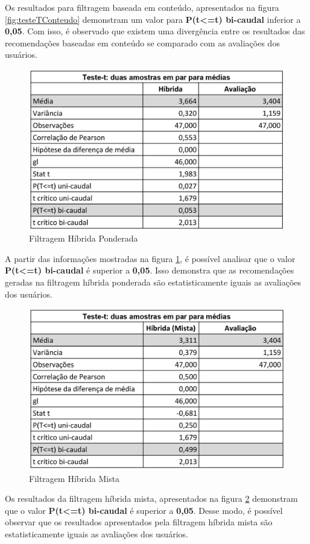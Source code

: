 Os resultados para filtragem baseada em conteúdo, apresentados na figura \ref{fig:testeTConteudo} demonstram um valor para \textbf{P(t<=t) bi-caudal} inferior a \textbf{0,05}. Com isso, é observado que existem uma divergência entre os resultados das recomendações baseadas em conteúdo se comparado com as avaliações dos usuários.

\begin{figure}[H]
	\centering
	\includegraphics[width=.7\linewidth]{imagens/testeTPonderada.jpg}
	\caption[Teste T: Filtragem Híbrida Ponderada]{Filtragem Híbrida Ponderada}
    \label{fig:testeTPonderado}
\end{figure}

A partir das informações mostradas na figura \ref{fig:testeTPonderado}, é possível analisar que o valor \textbf{P(t<=t) bi-caudal} é superior a \textbf{0,05}. Isso demonstra que as recomendações geradas na filtragem híbrida ponderada são estatisticamente iguais as avaliações dos usuários.

\begin{figure}[H]
	\centering
	\includegraphics[width=.7\linewidth]{imagens/testeTMisto.jpg}
	\caption[Teste T: Filtragem Híbrida Mista]{Filtragem Híbrida Mista}
    \label{fig:testeTMisto}
\end{figure}

Os resultados da filtragem híbrida mista, apresentados na figura \ref{fig:testeTMisto} demonstram que o valor \textbf{P(t<=t) bi-caudal} é superior a \textbf{0,05}. Desse modo, é possível observar que os resultados apresentados pela filtragem híbrida mista são estatisticamente iguais as avaliações dos usuários.

